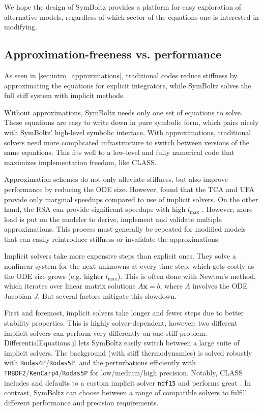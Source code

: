 \documentclass{aa}
\newcommand\lmax{l_\text{max}}
\begin{document}
We hope the design of SymBoltz provides a platform for easy exploration of alternative models, regardless of which sector of the equations one is interested in modifying.

\subsection{Approximation-freeness vs. performance}

As seen in \cref{sec:intro_approximations}, traditional codes reduce stiffness by approximating the equations for explicit integrators,
while SymBoltz solves the full stiff system with implicit methods.

Without approximations, SymBoltz needs only one set of equations to solve.
These equations are easy to write down in pure symbolic form, which pairs nicely with SymBoltz' high-level symbolic interface.
With approximations, traditional solvers need more complicated infrastructure to switch between versions of the same equations.
This fits well to a low-level and fully numerical code that maximizes implementation freedom, like CLASS.

Approximation schemes do not only alleviate stiffness, but also improve performance by reducing the ODE size.
However, \cite{lesgourguesCosmicLinearAnisotropy2011a,hahnDISCODJDifferentiableEinsteinBoltzmann2024} found that the TCA and UFA provide only marginal speedups compared to use of implicit solvers.
On the other hand, the RSA can provide significant speedups with high $\lmax$ \citep{lesgourguesCosmicLinearAnisotropy2011a,moserSymbolicImplementationExtensions2022}.
However, more load is put on the modeler to derive, implement and validate multiple approximations.
This process must generally be repeated for modified models that can easily reintroduce stiffness or invalidate the approximations.

Implicit solvers take more expensive steps than explicit ones.
They solve a nonlinear system for the next unknowns at every time step, which gets costly as the ODE size grows (e.g. higher $\lmax$).
This is often done with Newton's method, which iterates over linear matrix solutions $A\boldsymbol{x} = b$, where $A$ involves the ODE Jacobian $J$.
But several factors mitigate this slowdown.

First and foremost, implicit solvers take longer and fewer steps due to better stability properties.
This is highly solver-dependent, however: two different implicit solvers can perform very differently on one stiff problem.
DifferentialEquations.jl lets SymBoltz easily switch between a large suite of implicit solvers.
The background (with stiff thermodynamics) is solved robustly with \texttt{Rodas4P}/\texttt{Rodas5P}, and the perturbations efficiently with \texttt{TRBDF2}/\texttt{KenCarp4}/\texttt{Rodas5P} for low/medium/high precision.
Notably, CLASS includes and defaults to a custom implicit solver \texttt{ndf15} and performs great \citep{lesgourguesCosmicLinearAnisotropy2011a}.
In contrast, SymBoltz can choose between a range of compatible solvers to fulfill different performance and precision requirements.
\end{document}
